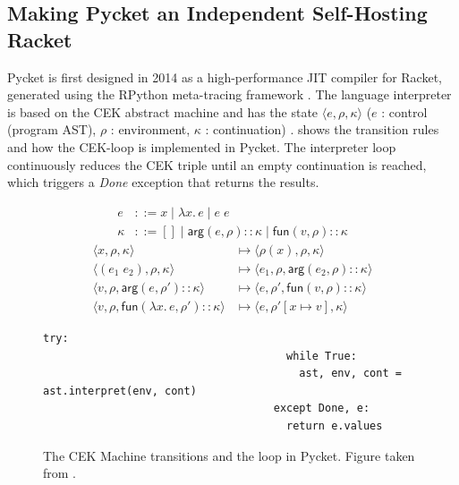 
\subsection{Making Pycket an Independent Self-Hosting Racket}
\label{subsec:pycket}

Pycket is first designed in 2014 as a high-performance JIT compiler
for Racket, generated using the RPython meta-tracing framework
\cite{bolz14-racket}. The language interpreter is based on the CEK
abstract machine and has the state $\langle e, \rho, \kappa \rangle$ ($e$ : control
(program AST), $\rho$ : environment, $\kappa$ : continuation)
\cite{felleisen87}.  shows the transition rules and
how the CEK-loop is implemented in Pycket. The interpreter loop
continuously reduces the CEK triple until an empty continuation is
reached, which triggers a \emph{Done} exception that returns the
results.

\begin{figure}[h!]
  \small
\begin{align*}
e &::= x \mid \lambda x.\, e \mid e \; e\\
\kappa &::= [] \mid \mathsf{arg}(e,\rho){::}\kappa \mid \mathsf{fun}(v,\rho){::}\kappa
\end{align*}
\begin{align*}
\langle x, \rho, \kappa \rangle & \longmapsto
    \langle \rho(x), \rho, \kappa \rangle \\
\langle (e_1 \; e_2), \rho, \kappa \rangle & \longmapsto
    \langle e_1, \rho, \mathsf{arg}(e_2, \rho){::}\kappa \rangle \\
\langle v, \rho, \mathsf{arg}(e,\rho'){::}\kappa \rangle & \longmapsto
    \langle e, \rho', \mathsf{fun}(v,\rho){::}\kappa \rangle \\
\langle v, \rho, \mathsf{fun}(\lambda x. \, e, \rho'){::}\kappa \rangle & \longmapsto
    \langle e, \rho'[x\mapsto v], \kappa \rangle
\end{align*}
\begin{lstlisting}[mathescape]
                                    try:
                                      while True:
                                        ast, env, cont = ast.interpret(env, cont)
                                    except Done, e:
                                      return e.values
\end{lstlisting}
\caption{The CEK Machine transitions and the loop in Pycket. Figure taken from \cite{pycket15}.}
\label{fig:cek}
\end{figure}

